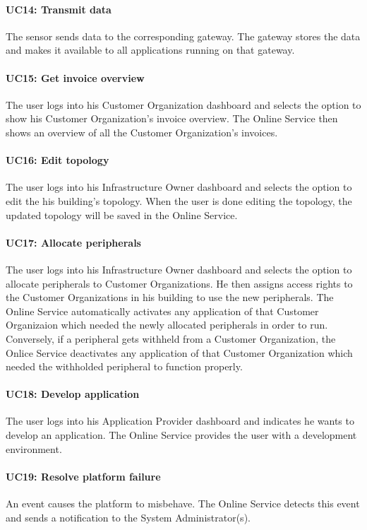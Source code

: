 \documentclass[english,peerreview]{sareport}
\begin{document}
\paragraph{UC14: Transmit data}
The sensor sends data to the corresponding gateway. The gateway stores the data and makes it available to all applications running on that gateway.

\paragraph{UC15: Get invoice overview}
The user logs into his Customer Organization dashboard and selects the option to show his Customer Organization's invoice overview. The Online Service then shows an overview of all the Customer Organization's invoices.

\paragraph{UC16: Edit topology}
The user logs into his Infrastructure Owner dashboard and selects the option to edit the his building's  topology. When the user is done editing the topology, the updated topology will be saved in the Online Service.

\paragraph{UC17: Allocate peripherals}
The user logs into his Infrastructure Owner dashboard and selects the option to allocate peripherals to Customer Organizations. He then assigns access rights to the Customer Organizations in his building to use the new peripherals. The Online Service automatically activates any application of that Customer Organizaion which needed the newly allocated peripherals in order to run. Conversely, if a peripheral gets withheld from a Customer Organization, the Onlice Service deactivates any application of that Customer Organization which needed the withholded peripheral to function properly.

\paragraph{UC18: Develop application}
The user logs into his Application Provider dashboard and indicates he wants to develop an application.
The Online Service provides the user with a development environment.

\paragraph{UC19: Resolve platform failure}
An event causes the platform to misbehave. The Online Service detects this event and sends a notification to the System Administrator(s).
\end{document}
